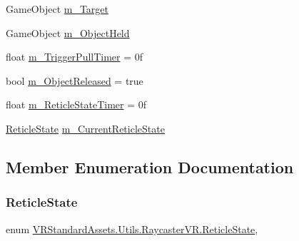 \begin{DoxyCompactItemize}
Game\+Object \mbox{\hyperlink{class_v_r_standard_assets_1_1_utils_1_1_raycaster_v_r_a643af822a4a662ceb4a8b3dc42b71a7f}{m\+\_\+\+Target}}
\item 
Game\+Object \mbox{\hyperlink{class_v_r_standard_assets_1_1_utils_1_1_raycaster_v_r_af5246fa12faee8799d34c98da4d43e0a}{m\+\_\+\+Object\+Held}}
\item 
float \mbox{\hyperlink{class_v_r_standard_assets_1_1_utils_1_1_raycaster_v_r_a1fac3f431a4947b5ff30915004be4491}{m\+\_\+\+Trigger\+Pull\+Timer}} = 0f
\item 
bool \mbox{\hyperlink{class_v_r_standard_assets_1_1_utils_1_1_raycaster_v_r_ab07ed62bf6158d940e00efffa6269784}{m\+\_\+\+Object\+Released}} = true
\item 
float \mbox{\hyperlink{class_v_r_standard_assets_1_1_utils_1_1_raycaster_v_r_a73cae4edd2893e9168ab029350ae10e2}{m\+\_\+\+Reticle\+State\+Timer}} = 0f
\item 
\mbox{\hyperlink{class_v_r_standard_assets_1_1_utils_1_1_raycaster_v_r_a6d511e0bf48faef93364d51b08d53f01}{Reticle\+State}} \mbox{\hyperlink{class_v_r_standard_assets_1_1_utils_1_1_raycaster_v_r_a57ab24a6eda192ebce83cf84e580265c}{m\+\_\+\+Current\+Reticle\+State}}
\end{DoxyCompactItemize}


\subsection{Member Enumeration Documentation}
\mbox{\label{class_v_r_standard_assets_1_1_utils_1_1_raycaster_v_r_a6d511e0bf48faef93364d51b08d53f01}} 
\subsubsection{\texorpdfstring{Reticle\+State}{ReticleState}}
{\footnotesize\ttfamily enum \mbox{\hyperlink{class_v_r_standard_assets_1_1_utils_1_1_raycaster_v_r_a6d511e0bf48faef93364d51b08d53f01}{V\+R\+Standard\+Assets.\+Utils.\+Raycaster\+V\+R.\+Reticle\+State}}\hspace{0.3cm}{\ttfamily [strong]}, {\ttfamily [private]}}

